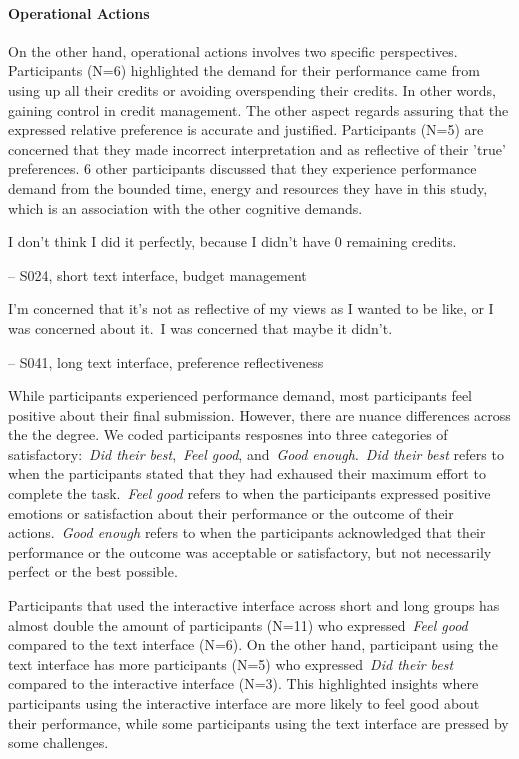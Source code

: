 \paragraph{Operational Actions}
On the other hand, operational actions involves two specific perspectives. Participants (N=6) highlighted the demand for their performance came from using up all their credits or avoiding overspending their credits. In other words, gaining control in credit management. The other aspect regards assuring that the expressed relative preference is accurate and justified. Participants (N=5) are concerned that they made incorrect interpretation and as reflective of their 'true' preferences. $6$ other participants discussed that they experience performance demand from the bounded time, energy and resources they have in this study, which is an association with the other cognitive demands.

\begin{displayquote}
I don't think I did it perfectly, because I didn't have 0 remaining credits.
    
\noindent \hfill -- S024, short text interface, budget management
\end{displayquote}

\begin{displayquote}
I'm concerned that it's not as reflective of my views as I wanted to be like, or I was concerned about it.~\bracketellipsis I was concerned that maybe it didn't.

\noindent \hfill -- S041, long text interface, preference reflectiveness
\end{displayquote}

While participants experienced performance demand, most participants feel positive about their final submission. However, there are nuance differences across the the degree. We coded participants resposnes into three categories of satisfactory:~\textit{Did their best},~\textit{Feel good}, and~\textit{Good enough}.~\textit{Did their best} refers to when the participants stated that they had exhaused their maximum effort to complete the task.~\textit{Feel good} refers to when the participants expressed positive emotions or satisfaction about their performance or the outcome of their actions.~\textit{Good enough} refers to when the participants acknowledged that their performance or the outcome was acceptable or satisfactory, but not necessarily perfect or the best possible.

Participants that used the interactive interface across short and long groups has almost double the amount of participants (N=11) who expressed~\textit{Feel good} compared to the text interface (N=6). On the other hand, participant using the text interface has more participants (N=5) who expressed~\textit{Did their best} compared to the interactive interface (N=3). This highlighted insights where participants using the interactive interface are more likely to feel good about their performance, while some participants using the text interface are pressed by some challenges.

